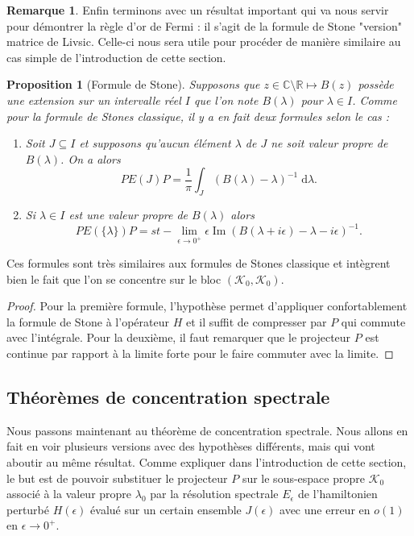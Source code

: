 \documentclass[12pt,openany,a4paper, titlepage]{article}
\newcommand{\f}[2]{\frac{#1}{#2}}
\newcommand{\lp}{\left(}
\newcommand{\rp}{\right)}
\newcommand{\dd}{\;\mathrm{d}}
\newcommand{\R}{\mathbb{R}}
\newcommand{\C}{\mathbb{C}}
\newcommand{\im}{\operatorname{Im}}
\newtheorem{prop}{Proposition}
\theoremstyle{definition}
\theoremstyle{definition}
\theoremstyle{definition}
\theoremstyle{definition}
\theoremstyle{definition}
\newtheorem{rem}{Remarque}
\theoremstyle{definition}
\begin{document}
\begin{rem}
Enfin terminons avec un résultat important qui va nous servir pour démontrer la règle d'or de Fermi : il s'agit de la formule de Stone "version" matrice de Livsic. Celle-ci nous sera utile pour procéder de manière similaire au cas simple de l'introduction de cette section.

\begin{prop}[Formule de Stone]\label{Stones_Liv}
    Supposons que $z\in\C\setminus\R \mapsto B(z)$ possède une extension sur un intervalle réel $I$ que l'on note $B(\lambda)$ pour $\lambda\in I$. Comme pour la formule de Stones classique, il y a en fait deux formules selon le cas :
    \begin{enumerate}
        \item Soit $J\subseteq I$ et supposons qu'aucun élément $\lambda$ de $J$ ne soit valeur propre de $B(\lambda)$. On a alors
        \begin{equation}
            PE(J)P = \f{1}{\pi}\int_J (B(\lambda) - \lambda)^{-1}\dd \lambda.
        \end{equation}
        \item Si $\lambda \in I$ est une valeur propre de $B(\lambda)$ alors
        \begin{equation}
            PE(\{ \lambda \})P = st-\lim\limits_{\epsilon \rightarrow 0^+} \epsilon \im \lp B(\lambda + i\epsilon  )- \lambda - i\epsilon\rp ^{-1}.
        \end{equation}
    \end{enumerate}
\end{prop}
Ces formules sont très similaires aux formules de Stones classique et intègrent bien le fait que l'on se concentre sur le bloc $(\mathcal{K}_0,\mathcal{K}_0)$.

\begin{proof}
    Pour la première formule, l'hypothèse permet d'appliquer confortablement la formule de Stone à l'opérateur $H$ et il suffit de compresser par $P$ qui commute avec l'intégrale.
    Pour la deuxième, il faut remarquer que le projecteur $P$ est continue par rapport à la limite forte pour le faire commuter avec la limite.
\end{proof}


\subsection{Théorèmes de concentration spectrale}\label{concentration}

Nous passons maintenant au théorème de concentration spectrale. Nous allons en fait en voir plusieurs versions avec des hypothèses différents, mais qui vont aboutir au même résultat. Comme expliquer dans l'introduction de cette section, le but est de pouvoir substituer le projecteur $P$ sur le sous-espace propre $\mathcal{K}_0$ associé à la valeur propre $\lambda_0$ par la résolution spectrale $E_\epsilon$ de l'hamiltonien perturbé $H(\epsilon)$ évalué sur un certain ensemble $J(\epsilon)$ avec une erreur en $o(1)$ en $\epsilon \rightarrow 0^+$.


\end{rem}
\end{document}
